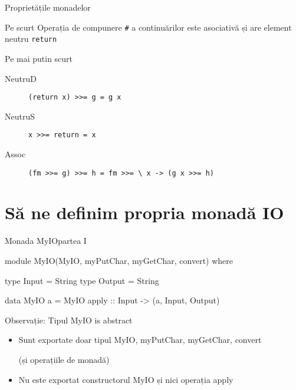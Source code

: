 \documentclass[xcolor=pdftex,romanian,colorlinks]{beamer}
\begin{document}
\begin{frame}[fragile]{Proprietățile monadelor}
\begin{block}{Pe scurt}
Operația de compunere \lstinline$#$ a continuărilor este asociativă și are element neutru \lstinline$return$
\end{block}

\begin{block}{Pe mai putin scurt}
\begin{description}
\item[NeutruD] \lstinline$(return x) >>= g = g x$
\item[NeutruS] \lstinline$x >>= return = x$
\item[Assoc] \lstinline$(fm >>= g) >>= h = fm >>= \ x -> (g x >>= h)$
\end{description}
\end{block}

\end{frame}






%

\section{Să ne definim propria monadă IO}


\begin{frame}[fragile]{Monada MyIO}{partea I}
\begin{asciihs}
module MyIO(MyIO, myPutChar, myGetChar, convert) where

type Input = String
type Output = String

data MyIO a = MyIO { apply :: Input -> (a, Input, Output) }

\end{asciihs}

\begin{block}{Observație: Tipul MyIO is abstract}
\begin{itemize} 
\item Sunt exportate doar tipul MyIO, myPutChar, myGetChar, convert 

(și operațiile de monadă)
\item Nu este exportat constructorul MyIO și nici operația apply
\end{itemize}
\end{block} 
\end{frame}

%
\end{document}

